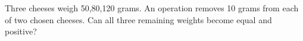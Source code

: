 Three cheeses weigh 50,80,120 grams. An operation removes 10 grams from each of two chosen cheeses. Can all three remaining weights become equal and positive?
